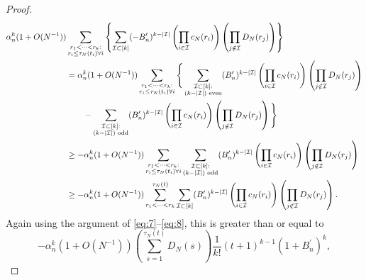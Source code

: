 \documentclass{article}
\newcommand{\1}[1]{\mathbbm{1}_{#1}}
\begin{document}
\begin{proof}
\begin{align}
\alpha_n^k (1 + O(N^{-1}) ) &\sum_{\substack{r_1 <\dots< r_k :\\ r_i \leq \tau_N(t_i) \forall i}}
\left\{ \sum_{\mathcal{I} \subset [k]} (-B_n^\prime)^{k-|\mathcal{I}|}
\left( \prod_{i\in\mathcal{I}} c_N(r_i) \right)
\left( \prod_{j\notin\mathcal{I}} D_N(r_j) \right)
\right\} \notag\\
&= \alpha_n^k (1 + O(N^{-1}) )
\sum_{\substack{r_1 <\dots< r_k :\\ r_i \leq \tau_N(t_i) \forall i}}
\Bigg\{ \sum_{\substack{\mathcal{I} \subset [k]: \\ (k-|\mathcal{I}|) \text{ even} }} (B_n^\prime)^{k-|\mathcal{I}|}
\left( \prod_{i\in\mathcal{I}} c_N(r_i) \right)
\left( \prod_{j\notin\mathcal{I}} D_N(r_j) \right) \notag\\
&\qquad- \sum_{\substack{\mathcal{I} \subset [k]: \\ (k-|\mathcal{I}|) \text{ odd} }} (B_n^\prime)^{k-|\mathcal{I}|}
\left( \prod_{i\in\mathcal{I}} c_N(r_i) \right)
\left( \prod_{j\notin\mathcal{I}} D_N(r_j) \right) \Bigg\} \notag\\
&\geq - \alpha_n^k (1 + O(N^{-1}) )
\sum_{\substack{r_1 <\dots< r_k :\\ r_i \leq \tau_N(t_i) \forall i}}
\sum_{\substack{\mathcal{I} \subset [k]: \\ (k-|\mathcal{I}|) \text{ odd} }} (B_n^\prime)^{k-|\mathcal{I}|}
\left( \prod_{i\in\mathcal{I}} c_N(r_i) \right)
\left( \prod_{j\notin\mathcal{I}} D_N(r_j) \right) \notag\\
&\geq - \alpha_n^k (1 + O(N^{-1}) )
\sum_{r_1 <\dots< r_k}^{\tau_N(t)}
\sum_{ \mathcal{I} \subset [k] } (B_n^\prime)^{k-|\mathcal{I}|}
\left( \prod_{i\in\mathcal{I}} c_N(r_i) \right)
\left( \prod_{j\notin\mathcal{I}} D_N(r_j) \right) . \label{eq:79a}
\end{align}
Again using the argument of \eqref{eq:7}--\eqref{eq:8}, this is greater than or equal to
\begin{equation}
- \alpha_n^k (1 + O(N^{-1}) ) \left( \sum_{s=1}^{\tau_N(t)} D_N(s) \right) \frac{1}{k!} (t+1)^{k-1} (1 + B_n^\prime)^k , \label{eq:80a}

\end{equation}
\end{proof}
\end{document}
